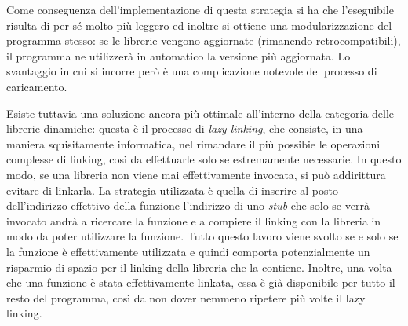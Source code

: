 \documentclass[class=book, crop=false, oneside]{standalone}
\begin{document}
Come conseguenza dell'implementazione di questa strategia si ha che l'eseguibile risulta di per sé molto più leggero ed inoltre si ottiene una modularizzazione del programma stesso: se le librerie vengono aggiornate (rimanendo retrocompatibili), il programma ne utilizzerà in automatico la versione più aggiornata. Lo svantaggio in cui si incorre però è una complicazione notevole del processo di caricamento.

Esiste tuttavia una soluzione ancora più ottimale all'interno della categoria delle librerie dinamiche: questa è il processo di \emph{lazy linking}, che consiste, in una maniera squisitamente informatica, nel rimandare il più possibie le operazioni complesse di linking, così da effettuarle solo se estremamente necessarie. In questo modo, se una libreria non viene mai effettivamente invocata, si può addirittura evitare di linkarla. La strategia utilizzata è quella di inserire al posto dell'indirizzo effettivo della funzione l'indirizzo di uno \emph{stub} che solo se verrà invocato andrà a ricercare la funzione e a compiere il linking con la libreria in modo da poter utilizzare la funzione. Tutto questo lavoro viene svolto se e solo se la funzione è effettivamente utilizzata e quindi comporta potenzialmente un risparmio di spazio per il linking della libreria che la contiene. Inoltre, una volta che una funzione è stata effettivamente linkata, essa è già disponibile per tutto il resto del programma, così da non dover nemmeno ripetere più volte il lazy linking.
\end{document}

